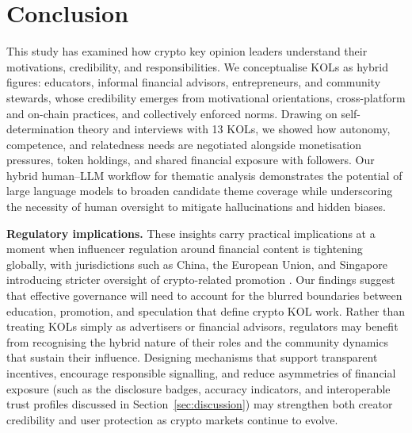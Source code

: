 
\section{Conclusion}\label{sec:conclusion}

This study has examined how crypto key opinion leaders understand their motivations, credibility, and responsibilities. We conceptualise KOLs as hybrid figures: educators, informal financial advisors, entrepreneurs, and community stewards, whose credibility emerges from motivational orientations, cross-platform and on-chain practices, and collectively enforced norms. Drawing on self-determination theory and interviews with 13 KOLs, we showed how autonomy, competence, and relatedness needs are negotiated alongside monetisation pressures, token holdings, and shared financial exposure with followers. Our hybrid human--LLM workflow for thematic analysis demonstrates the potential of large language models to broaden candidate theme coverage while underscoring the necessity of human oversight to mitigate hallucinations and hidden biases.

\textbf{Regulatory implications.}
These insights carry practical implications at a moment when influencer regulation around financial content is tightening globally, with jurisdictions such as China, the European Union, and Singapore introducing stricter oversight of crypto-related promotion \cite{ESMA2023MiCAR,MAS2024crypto}. Our findings suggest that effective governance will need to account for the blurred boundaries between education, promotion, and speculation that define crypto KOL work. Rather than treating KOLs simply as advertisers or financial advisors, regulators may benefit from recognising the hybrid nature of their roles and the community dynamics that sustain their influence. Designing mechanisms that support transparent incentives, encourage responsible signalling, and reduce asymmetries of financial exposure (such as the disclosure badges, accuracy indicators, and interoperable trust profiles discussed in Section~\ref{sec:discussion}) may strengthen both creator credibility and user protection as crypto markets continue to evolve.